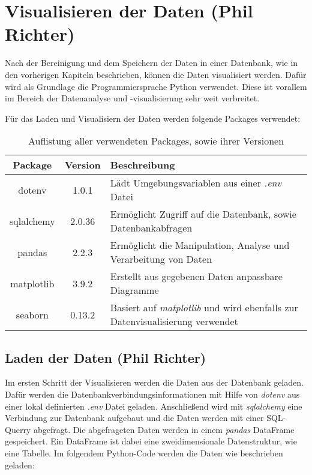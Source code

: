 \chapter{Visualisieren der Daten (Phil Richter)}
Nach der Bereinigung und dem Speichern der Daten in einer Datenbank, wie in den vorherigen Kapiteln beschrieben, können die Daten visualisiert werden. Dafür wird als Grundlage
die Programmiersprache Python verwendet. Diese ist vorallem im Bereich der Datenanalyse und -visualisierung sehr weit verbreitet.

Für das Laden und Visualisiern der Daten werden folgende Packages verwendet:
\begin{table}[h!]
    \centering
    \begin{tabularx}{\textwidth}{|c|c|>{\centering\arraybackslash}X|}
        \hline
        \textbf{Package} & \textbf{Version} & \textbf{Beschreibung} \\ \hline
        dotenv & 1.0.1 & Lädt Umgebungsvariablen aus einer \textit{.env} Datei \\ \hline
        sqlalchemy & 2.0.36 & Ermöglicht Zugriff auf die Datenbank, sowie Datenbankabfragen \\ \hline
        pandas & 2.2.3 & Ermöglicht die Manipulation, Analyse und Verarbeitung von Daten \\ \hline
        matplotlib & 3.9.2 & Erstellt aus gegebenen Daten anpassbare Diagramme \\ \hline
        seaborn & 0.13.2 & Basiert auf \textit{matplotlib} und wird ebenfalls zur Datenvisualisierung verwendet \\ \hline
    \end{tabularx}
    \caption{Auflistung aller verwendeten Packages, sowie ihrer Versionen}
\end{table}

\section{Laden der Daten (Phil Richter)}\label{sec:laden}
Im ersten Schritt der Visualisieren werden die Daten aus der Datenbank geladen. Dafür werden die Datenbankverbindungsinformationen mit Hilfe von \textit{dotenv}
aus einer lokal definierten \textit{.env} Datei geladen. Anschließend wird mit \textit{sqlalchemy} eine Verbindung zur Datenbank aufgebaut und die Daten werden 
mit einer SQL-Querry abgefragt. Die abgefrageten Daten werden in einem \textit{pandas} DataFrame gespeichert. Ein DataFrame ist dabei eine zweidimensionale Datenstruktur,
wie eine Tabelle. Im folgendem Python-Code werden die Daten wie beschrieben geladen:


